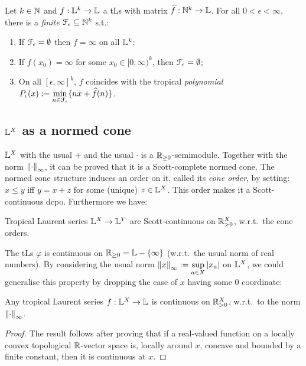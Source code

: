\begin{theorem}\label{theorem:fepsilon}
 Let $k\in\mathbb{N}$ and $f:\mathbb{L}^k\to\mathbb{L}$ a tLs with matrix $\widehat f:\mathbb{N}^k\to\mathbb{L}$.
 For all $0<\epsilon<\infty$, there is a \emph{finite} $\mathcal{F}_\epsilon \subseteq \mathbb{N}^k$ s.t.:
 \begin{enumerate}
  \item If $\mathcal{F}_\epsilon=\emptyset$ then $f=\infty$ on all $\mathbb{L}^k$;
  \item If $f(x_0)=\infty$ for some $x_0\in[0,\infty)^k$, then $\mathcal{F}_\epsilon=\emptyset$;
  \item On all $[\epsilon,\infty]^k$, $f$ coincides with the tropical \emph{polynomial} $P_\epsilon(x):=\min\limits_{n\in \mathcal{F}_\epsilon}\{nx+\widehat f(n)\}$.
 \end{enumerate}
\end{theorem}




\subsection{$\mathbb{L}^{X}$ as a normed cone}

$\mathbb{L}^X$ with the usual $+$ and the usual $\cdot$ is a $\mathbb{R}_{\geq0}$-semimodule.
Together with the norm $\left\lVert\cdot\right\rVert_\infty$, it can be proved that it is a Scott-complete normed cone.
The normed cone structure induces an order on it, called its \emph{cone order}, by setting:
$x\leq y$ iff $y=x+z$ for some (unique) $z\in\mathbb{L}^X$.
This order makes it a Scott-continuous dcpo.
Furthermore we have:

\begin{proposition}
  Tropical Laurent series $\mathbb{L}^X\to\mathbb{L}^Y$ are Scott-continuous on $\mathbb{R}_{>0}^X$, w.r.t.\ the cone orders.
\end{proposition}
The tLs $\varphi$ is continuous on $\mathbb{R}_{\geq0}=\mathbb{L}-\{\infty\}$ (w.r.t.\ the usual norm of real numbers).
By considering the usual norm $\left\lVert x\right\rVert_\infty:=\sup\limits_{a\in X} \left\lvert x_a\right\rvert$ on $\mathbb{L}^X$, we could generalise this property by dropping the case of $x$ having some $0$ coordinate:

\begin{theorem}\label{thm:cont}
 Any tropical Laurent series $f:\mathbb{L}^X\to\mathbb{L}$ is continuous on $\mathbb{R}_{>0}^X$, w.r.t.\ to the norm $\left\lVert\cdot\right\rVert_\infty$.
\end{theorem}
\begin{proof}
 The result follows after proving that if a real-valued function on a locally convex topological $\mathbb{R}$-vector space is, locally around $x$, concave and bounded by a finite constant, then it is continuous at $x$.
\end{proof}


